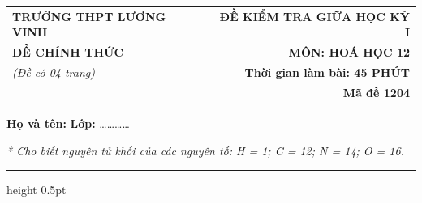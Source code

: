 \documentclass[11pt,a4paper]{article}
\begin{document}
\noindent
\begin{tabularx}{\textwidth}{@{}X r@{}}
\textbf{TRƯỜNG THPT LƯƠNG VINH} & \textbf{ĐỀ KIỂM TRA GIỮA HỌC KỲ I} \\
\textbf{ĐỀ CHÍNH THỨC} & \textbf{MÔN: HOÁ HỌC 12} \\
\textit{(Đề có 04 trang)} & \textbf{Thời gian làm bài: 45 PHÚT} \\
& \textbf{Mã đề 1204}
\end{tabularx}

\vspace{2pt}
\noindent\textbf{Họ và tên:} \dotfill \textbf{Lớp:} \dots\dots\dots\dots

\vspace{2pt}
\noindent\textit{* Cho biết nguyên tử khối của các nguyên tố: H = 1; C = 12; N = 14; O = 16.}
\vspace{2pt}
\hrule height 0.5pt
\vspace{6pt}
\end{document}
